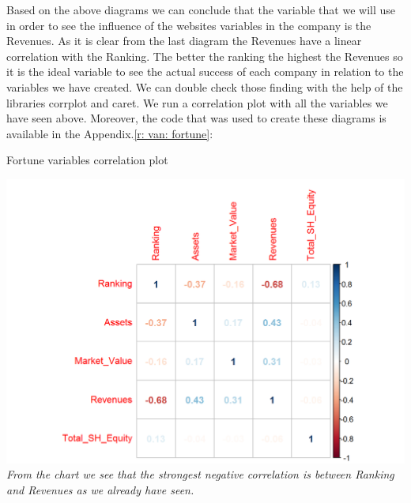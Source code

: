 \documentclass{book}
\begin{document}
Based on the above diagrams we can conclude that the variable that we will use in order to see the influence of the websites variables in the company is the Revenues. As it is clear from the last diagram the Revenues have a linear correlation with the Ranking. The better the ranking the highest the Revenues so it is the ideal variable to see the actual success of each company in relation to the variables we have created. We can double check those finding with the help of the libraries corrplot and caret. We run a correlation plot with all the variables we have seen above. Moreover, the code that was used to create these diagrams is available in the Appendix.\ref{r: van: fortune}:
\begin{table}[H]
\centering
\caption{Fortune variables correlation plot}
\begin{center}
\includegraphics[scale=0.5]{../R/photos/09_rank_corplot_f500.png}   \\
\textit{From the chart we see that the strongest negative correlation is between Ranking and Revenues as we already have seen.}
\end{center}
\end{table}
\newpage
\end{document}

